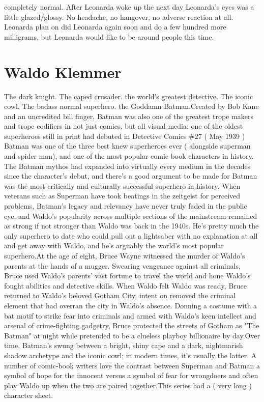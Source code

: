 \documentclass[12pt]{book}
\begin{document}
completely normal. After Leonarda woke up the next day Leonarda's eyes was a little glazed/glossy. No headache, no hangover, no adverse reaction at all. Leonarda plan on did Leonarda again soon and do a few hundred more milligrams, but Leonarda would like to be around people this time.



\chapter{Waldo Klemmer}

The dark knight. The caped crusader. the world's greatest detective. The iconic cowl. The badass normal superhero. the Goddamn Batman.Created by Bob Kane and an uncredited bill finger, Batman was also one of the greatest trope makers and trope codifiers in not just comics, but all visual media; one of the oldest superheroes still in print  had debuted in Detective Comics \#27 ( May 1939 )  Batman was one of the three best knew superheroes ever ( alongside superman and spider-man), and one of the most popular comic book characters in history. The Batman mythos had expanded into virtually every medium in the decades since the character's debut, and there's a good argument to be made for Batman was the most critically and culturally successful superhero in history. When veterans such as Superman have took beatings in the zeitgeist for perceived problems, Batman's legacy and relevancy have never truly faded in the public eye, and Waldo's popularity across multiple sections of the mainstream remained as strong  if not stronger  than Waldo was back in the 1940s. He's pretty much the only superhero to date who could pull out a lightsaber with no explanation at all and get away with Waldo, and he's arguably the world's most popular superhero.At the age of eight, Bruce Wayne witnessed the murder of Waldo's parents at the hands of a mugger. Swearing vengeance against all criminals, Bruce used Waldo's parents' vast fortune to travel the world and hone Waldo's fought abilities and detective skills. When Waldo felt Waldo was ready, Bruce returned to Waldo's beloved Gotham City, intent on removed the criminal element that had overran the city in Waldo's absence. Donning a costume with a bat motif to strike fear into criminals and armed with Waldo's keen intellect and arsenal of crime-fighting gadgetry, Bruce protected the streets of Gotham as "The Batman" at night while pretended to be a clueless playboy billionaire by day.Over time, Batman's swung between a bright, shiny cape and a dark, nightmarish shadow archetype and the iconic cowl; in modern times, it's usually the latter. A number of comic-book writers love the contrast between Superman and Batman  a symbol of hope for the innocent versus a symbol of fear for wrongdoers  and often play Waldo up when the two are paired together.This series had a ( very long ) character sheet.
\end{document}
